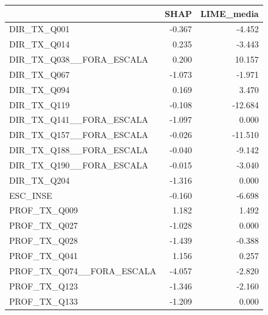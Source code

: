 \begin{tabular}{lrr}
\toprule
 & SHAP & LIME\_media \\
\midrule
DIR\_TX\_Q001 & -0.367 & -4.452 \\
DIR\_TX\_Q014 & 0.235 & -3.443 \\
DIR\_TX\_Q038\_\_FORA\_ESCALA & 0.200 & 10.157 \\
DIR\_TX\_Q067 & -1.073 & -1.971 \\
DIR\_TX\_Q094 & 0.169 & 3.470 \\
DIR\_TX\_Q119 & -0.108 & -12.684 \\
DIR\_TX\_Q141\_\_FORA\_ESCALA & -1.097 & 0.000 \\
DIR\_TX\_Q157\_\_FORA\_ESCALA & -0.026 & -11.510 \\
DIR\_TX\_Q188\_\_FORA\_ESCALA & -0.040 & -9.142 \\
DIR\_TX\_Q190\_\_FORA\_ESCALA & -0.015 & -3.040 \\
DIR\_TX\_Q204 & -1.316 & 0.000 \\
ESC\_INSE & -0.160 & -6.698 \\
PROF\_TX\_Q009 & 1.182 & 1.492 \\
PROF\_TX\_Q027 & -1.028 & 0.000 \\
PROF\_TX\_Q028 & -1.439 & -0.388 \\
PROF\_TX\_Q041 & 1.156 & 0.257 \\
PROF\_TX\_Q074\_\_FORA\_ESCALA & -4.057 & -2.820 \\
PROF\_TX\_Q123 & -1.346 & -2.160 \\
PROF\_TX\_Q133 & -1.209 & 0.000 \\
\bottomrule
\end{tabular}
